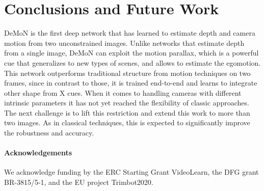 \documentclass[10pt,twocolumn,letterpaper]{article}
\begin{document}
\section{Conclusions and Future Work}
DeMoN is the first deep network that has learned to estimate depth and camera motion from two unconstrained images. 
Unlike networks that estimate depth from a single image, DeMoN can exploit the motion parallax, which is a powerful cue that generalizes to new types of scenes, and allows to estimate the egomotion.  
This network outperforms traditional structure from motion techniques on two frames, since in contrast to those, it is trained end-to-end and learns to integrate other shape from X cues. 
When it comes to handling cameras with different intrinsic parameters it has not yet reached the flexibility of classic approaches.
The next challenge is to lift this restriction and extend this work to more than two images.
As in classical techniques, this is expected to significantly improve the robustness and accuracy.


\vspace{-0.7em}
\paragraph{Acknowledgements}
We acknowledge funding by the ERC Starting Grant VideoLearn, the DFG 
grant BR-3815/5-1, and the EU project Trimbot2020.

\clearpage{\small


}

\end{document}
